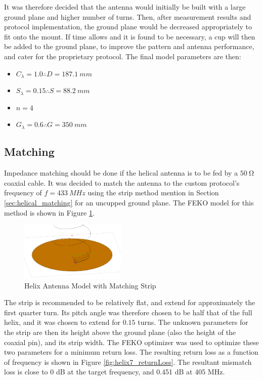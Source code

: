 It was therefore decided that the antenna would initially be built with a large ground plane and higher number of turns. Then, after measurement results and protocol implementation, the ground plane would be decreased appropriately to fit onto the mount. If time allows and it is found to be necessary, a cup will then be added to the ground plane, to improve the pattern and antenna performance, and cater for the proprietary protocol. The final model parameters are then:
\begin{itemize}
    \item $C_\lambda = 1.0 \therefore D = \SI{187.1}{mm}$
    \item $S_\lambda = 0.15 \therefore S = \SI{88.2}{mm}$
    \item $n = 4$
    \item $G_\lambda = 0.6 \therefore G = \SI{350}{mm}$
\end{itemize}

\subsection{Matching}
Impedance matching should be done if the helical antenna is to be fed by a $\SI{50}{\ohm}$ coaxial cable. It was decided to match the antenna to the custom protocol's frequency of $f = \SI{433}{MHz}$ using the strip method mention in Section \ref{sec:helical_matching} for an uncupped ground plane. The FEKO model for this method is shown in Figure \ref{fig:helix7_model}.

\begin{figure}[!htb]
  \centering
  \includegraphics[width=0.45\textwidth]{helix7_model}
  \caption{Helix Antenna Model with Matching Strip}
  \label{fig:helix7_model}
\end{figure}

The strip is recommended to be relatively flat, and extend for approximately the first quarter turn. Its pitch angle was therefore chosen to be half that of the full helix, and it was chosen to extend for $0.15$ turns. The unknown parameters for the strip are then its height above the ground plane (also the height of the coaxial pin), and its strip width. The FEKO optimizer was used to optimize these two parameters for a minimum return loss. The resulting return loss as a function of frequency is shown in Figure \ref{fig:helix7_returnLoss}. The resultant mismatch loss is close to 0 dB at the target frequency, and 0.451 dB at 405 MHz.

